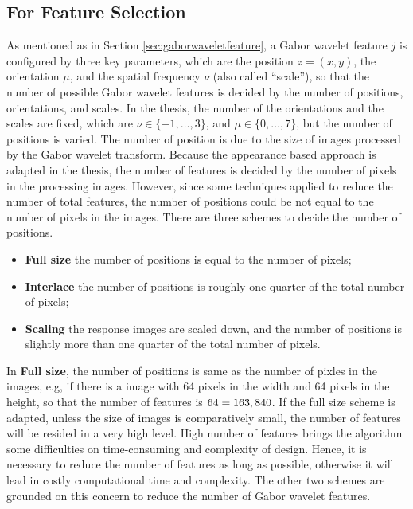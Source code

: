 \subsection{For Feature Selection}
As mentioned as in \mbox{Section} \ref{sec:gaborwaveletfeature}, a Gabor wavelet feature $j$ is configured by three key parameters, which are the position $z=(x,y)$, the orientation $\mu$, and the spatial frequency $\nu$ (also called ``scale''), so that the number of possible Gabor wavelet features is decided by the number of positions, orientations, and scales. In the thesis, the number of the orientations and the scales are fixed, which are $\nu\in\{-1,\ldots,3\}$, and $\mu\in\{0,\ldots,7\}$, but the number of positions is varied. The number of position is due to the size of images processed by the Gabor wavelet transform. Because the appearance based approach is adapted in the thesis, the number of features is decided by the number of pixels in the processing images. However, since some techniques applied to reduce the number of total features, the number of positions could be not equal to the number of pixels in the images. There are three schemes to decide the number of positions.
\begin{itemize}
 \item \textbf{Full size}   the number of positions is equal to the number of pixels;
 \item \textbf{Interlace}  the number of positions is roughly one quarter of the total number of pixels;
 \item \textbf{Scaling}    the response images are scaled down, and the number of positions is slightly more than one quarter of the total number of pixels.
\end{itemize}
In \textbf{Full size}, the number of positions is same as the number of pixles in the images, e.g, if there is a image with 64 pixels in the width and 64 pixels in the height, so that the number of features is $64\time 64 \time 5 \time 8 = 163,840$. If the full size scheme is adapted, unless the size of images is comparatively small, the number of features will be resided in a very high level. High number of features brings the algorithm some difficulties on time-consuming and complexity of design. Hence, it is necessary to reduce the number of features as long as possible, otherwise it will lead in costly computational time and complexity. The other two schemes are grounded on this concern to reduce the number of Gabor wavelet features. 

